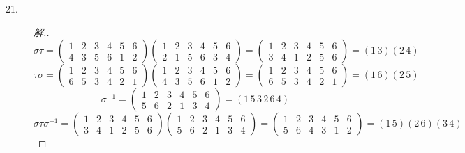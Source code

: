\documentclass[UTF8, onecolumn, a4paper]{article}
\begin{document}
\begin{description}
\item[21.] 
\begin{proof}[解.]
	\begin{equation*}
	\sigma\tau = \begin{pmatrix}
	1 & 2 & 3 & 4 & 5 & 6 \\
	4 & 3 & 5 & 6 & 1 & 2
	\end{pmatrix}
	\begin{pmatrix}
	1 & 2 & 3 & 4 & 5 & 6 \\
	2 & 1 & 5 & 6 & 3 & 4
	\end{pmatrix}
	= 
	\begin{pmatrix}
	1 & 2 & 3 & 4 & 5 & 6 \\
	3 & 4 & 1 & 2 & 5 & 6
	\end{pmatrix}
	= 
	(1\,3)(2\,4)
	\end{equation*}
	\begin{equation*}
	\tau\sigma = \begin{pmatrix}
	1 & 2 & 3 & 4 & 5 & 6 \\
	6 & 5 & 3 & 4 & 2 & 1
	\end{pmatrix}
	\begin{pmatrix}
	1 & 2 & 3 & 4 & 5 & 6 \\
	4 & 3 & 5 & 6 & 1 & 2
	\end{pmatrix}
	= 
	\begin{pmatrix}
	1 & 2 & 3 & 4 & 5 & 6 \\
	6 & 5 & 3 & 4 & 2 & 1
	\end{pmatrix}
	= 
	(1\,6)(2\,5)
	\end{equation*}
	\begin{equation*}
	\sigma^{-1} = \begin{pmatrix}
	1 & 2 & 3 & 4 & 5 & 6 \\
	5 & 6 & 2 & 1 & 3 & 4
	\end{pmatrix}
	= (1\,5\,3\,2\,6\,4)
	\end{equation*}
	\begin{equation*}
	\sigma\tau\sigma^{-1} = 
	\begin{pmatrix}
	1 & 2 & 3 & 4 & 5 & 6 \\
	3 & 4 & 1 & 2 & 5 & 6
	\end{pmatrix}
	\begin{pmatrix}
	1 & 2 & 3 & 4 & 5 & 6 \\
	5 & 6 & 2 & 1 & 3 & 4
	\end{pmatrix}
	= 
	\begin{pmatrix}
	1 & 2 & 3 & 4 & 5 & 6 \\
	5 & 6 & 4 & 3 & 1 & 2
	\end{pmatrix}
	= (1\,5)(2\,6)(3\,4)
	\end{equation*}
\end{proof}


\end{description}
\end{document}
